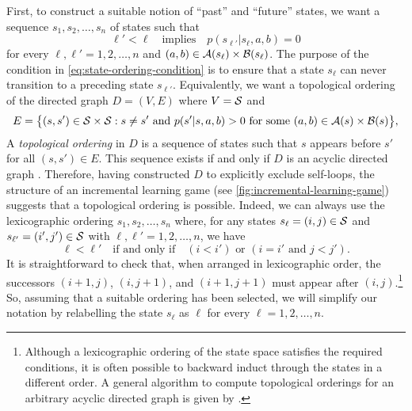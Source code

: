     First, to construct a suitable notion of ``past'' and ``future'' states, we want a sequence $s_1, s_2, \ldots, s_n$ of states such that
    \begin{equation}  \label{eq:state-ordering-condition}
        \ell' < \ell
        \quad\text{implies}\quad
        p(s_{\ell'} | s_\ell, a, b) = 0
    \end{equation}
    for every $\ell, \ell' = 1, 2, \ldots, n$ and $(a, b) \in \mathcal{A}(s_\ell) \times \mathcal{B}(s_\ell)$.
    The purpose of the condition in \eqref{eq:state-ordering-condition} is to ensure that a state $s_\ell$ can never transition to a preceding state $s_{\ell'}$.
    Equivalently, we want a topological ordering of the directed graph $D = (V, E)$ where $V = \mathcal{S}$ and
    \[
        E 
        =
        \big\{
        (s, s') \in \mathcal{S} \times \mathcal{S} 
        : s \neq s' \text{ and } p(s' | s, a, b) > 0 \text{ for some } (a, b) \in \mathcal{A}(s) \times \mathcal{B}(s)
        \big\},
    \]
    A \emph{topological ordering} in $D$ is a sequence of states such that $s$ appears before $s'$ for all $(s, s') \in E$.
    This sequence exists if and only if $D$ is an acyclic directed graph \parencite{Erciyes2018}.
    Therefore, having constructed $D$ to explicitly exclude self-loops, the structure of an incremental learning game (see \autoref{fig:incremental-learning-game}) suggests that a topological ordering is possible.
    Indeed, we can always use the lexicographic ordering $s_1, s_2, \ldots, s_n$ where, for any states $s_\ell = (i, j) \in \mathcal{S}$ and $s_{\ell'} = (i', j') \in \mathcal{S}$ with $\ell, \ell' = 1, 2, \ldots, n$, we have
    \begin{equation} \label{eq:lexicographic ordering}
        \ell < \ell'
        \quad\text{if and only if}\quad
        (i < i') \text{ or } (i = i' \text{ and } j < j').
    \end{equation}
    It is straightforward to check that, when arranged in lexicographic order, the successors $(i + 1, j)$, $(i, j + 1)$, and $(i + 1, j + 1)$ must appear after $(i, j)$.\footnote{Although
        a lexicographic ordering of the state space satisfies the required conditions, it is often possible to backward induct through the states in a different order.
        A general algorithm to compute topological orderings for an arbitrary acyclic directed graph is given by \parencite[Algorithm 6.11]{Erciyes2018}.
    }
    So, assuming that a suitable ordering has been selected, we will simplify our notation by relabelling the state $s_\ell$ as $\ell$ for every $\ell = 1, 2, \ldots, n$.

